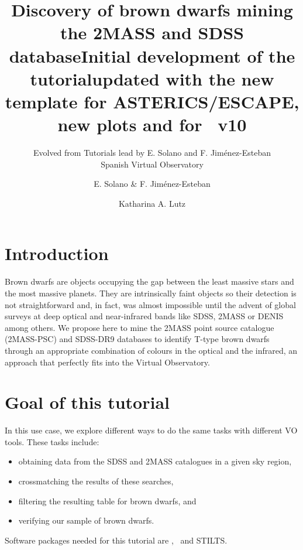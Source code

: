 \documentclass [a4paper, 12pt]{article}
\begin{document}
\author{Evolved from Tutorials lead by E. Solano and F. Jim\'enez-Esteban \\      %
Spanish Virtual Observatory}       %
\title{Discovery of brown dwarfs mining the 2MASS and SDSS database}   %
\makeescapetitle

\newpage
\author{E. Solano \& F. Jim\'enez-Esteban}   %
\title{Initial development of the tutorial}  %
\addescapehistory
\author{Katharina A. Lutz}
\title{updated with the new template for ASTERICS/ESCAPE, new plots and for \aladin\
v10}
\addescapehistory

\newpage
\tableofcontents

\newpage
\section{Introduction}
Brown dwarfs are objects occupying the gap between the least massive
stars and the most massive planets. They are intrinsically faint objects so
their detection is not straightforward and, in fact, was almost impossible
until the advent of global surveys at deep optical and near-infrared bands like
SDSS, 2MASS or DENIS among others. We propose here to mine the 2MASS point
source catalogue (2MASS-PSC) and
SDSS-DR9 databases to identify T-type brown dwarfs through an appropriate
combination of colours in the optical and the infrared, an approach that
perfectly fits into the Virtual
Observatory.

\section{Goal of this tutorial}
In this use case, we explore different ways to do the same tasks with different
VO tools. These tasks include:
\begin{itemize}
\item obtaining data from the SDSS and 2MASS catalogues in a given sky region,
\item crossmatching the results of these searches,
\item filtering the resulting table for brown dwarfs, and
\item verifying our sample of brown dwarfs.
\end{itemize}
\noindent Software packages needed for this tutorial are \aladin, \topcat\ and
STILTS.
\end{document}
